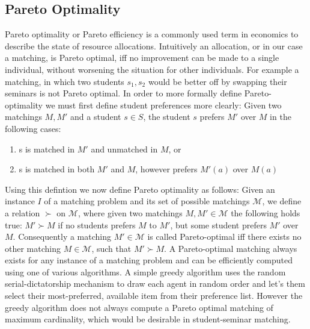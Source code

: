 \subsection{Pareto Optimality}
Pareto optimality or Pareto efficiency is a commonly used term in economics to describe the state of resource allocations. Intuitively an allocation, or in our case a matching, is Pareto optimal, iff no improvement can be made to a single individual, without worsening the situation for other individuals. For example a matching, in which two students $s_1, s_2$ would be better off by swapping their seminars is not Pareto optimal.
In order to more formally define Pareto-optimality we must first define student preferences more clearly: 
\newline
Given two matchings $M, M'$ and a student $s \in S$, the student $s$ prefers $M'$ over $M$ in the following cases:
\begin{enumerate}
    \item s is matched in $M'$ and unmatched in $M$, or
    \item s is matched in both $M'$ and $M$, however prefers $M'(a)$ over $M(a)$
\end{enumerate}
Using this defintion we now define Pareto optimality as follows: Given an instance $I$ of a matching problem and its set of possible matchings $\mathcal{M}$, we define a relation $\succ$ on $\mathcal{M}$, where given two matchings $M, M' \in \mathcal{M}$ the following holds true: $M' \succ M$ if no students prefers $M$ to $M'$, but some student prefers $M'$ over $M$. Consequently a matching $M' \in \mathcal{M}$ is called Pareto-optimal iff there exists no other matching $M \in \mathcal{M}$, such that $M' \succ M$.\cite{algorithmics}
A Pareto-optimal matching always exists for any instance of a matching problem and can be efficiently computed using one of various algorithms. A simple greedy algorithm uses the random serial-dictatorship mechanism to draw each agent in random order and let's them select their most-preferred, available item from their preference list.\cite{RothTwoSided, SerialDictatorship} However the greedy algorithm does not always compute a Pareto optimal matching of maximum cardinality, which would be desirable in student-seminar matching.\cite{Abraham:2005:POH:2129395.2129512}

